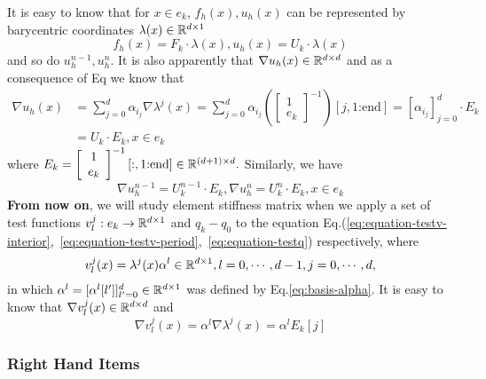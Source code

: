 It is easy to know that for $x\in e_k$, $f_h(x),u_h(x)$ can be represented by 
barycentric coordinates $\lambda(x)\in\mathbb{R}^{d\times1}$
\[f_h(x)=F_k\cdot\lambda(x),u_h(x)=U_k\cdot\lambda(x)\]
and so do $u_h^{n-1},u_h^n$. It is also apparently that
$\nabla u_h(x)\in\mathbb{R}^{d\times d}$ and as a consequence of Eq we know that
\begin{equation*}
  \begin{split}
  \nabla u_h(x)&=\sum_{j=0}^d\alpha_{i_j}\nabla\lambda^j(x)=\sum_{j=0}^d\alpha_{i_j}
\left(
\left[\begin{array}{c} 
  1 \\ 
  e_k 
\end{array}\right]^{-1}
\right)[j,1\text{:end}]
=[\alpha_{i_j}]_{j=0}^d\cdot
E_k \\
  &=U_k\cdot E_k,x\in e_k
  \end{split}
\end{equation*}
where $E_k=
\left[\begin{array}{c} 
  1 \\ 
  e_k 
\end{array}\right]^{-1}[:,1\text{:end}]\in\mathbb{R}^{(d+1)\times d}.
$
Similarly, we have
\begin{equation}\label{eq:u-gradient}
  \nabla u_h^{n-1}=U_k^{n-1}\cdot E_k,
  \nabla u_h^{n}=U_k^n\cdot E_k, x\in e_k
\end{equation}
\textbf{From now on}, we will study element stiffness matrix when we apply 
a set of test functions $v^j_l:e_k\to\mathbb{R}^{d\times1}$ and $q_k-q_0$ to the equation 
Eq.(\ref{eq:equation-testv-interior},~\ref{eq:equation-testv-period},~\ref{eq:equation-testq}) respectively, where
\[v^j_l(x)=\lambda^j(x)\alpha^l\in\mathbb{R}^{d\times1},l=0,\cdots,d-1,j=0,\cdots,d,\]
in which $\alpha^l=[\alpha^l[l']]_{l'=0}^d\in\mathbb{R}^{d\times1}$ was defined by Eq.\eqref{eq:basis-alpha}.
It is easy to know that $\nabla v^j_l(x)\in\mathbb{R}^{d\times d}$ and
\[
  \nabla v^j_l(x)=\alpha^l\nabla\lambda^j(x)
  =\alpha^lE_k[j]
  \]

\subsubsection{Right Hand Items}
